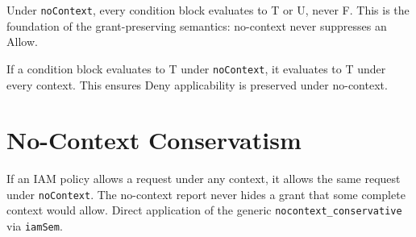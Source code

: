 \begin{theorem}\label{thm:evalCond_noContext_tu}
\leanok
Under \texttt{noContext}, every condition block evaluates to T or U,
never F.  This is the foundation of the grant-preserving semantics:
no-context never suppresses an Allow.
\end{theorem}

\begin{theorem}\label{thm:evalCond_noContext_T_imp}
\leanok
If a condition block evaluates to T under \texttt{noContext}, it
evaluates to T under every context.  This ensures Deny applicability
is preserved under no-context.
\end{theorem}

\section{No-Context Conservatism}

\begin{corollary}\label{cor:allows_nocontext_conservative}
\leanok
If an IAM policy allows a request under any context, it allows the
same request under \texttt{noContext}.  The no-context report never
hides a grant that some complete context would allow.  Direct
application of the generic \texttt{nocontext\_conservative} via
\texttt{iamSem}.
\end{corollary}
